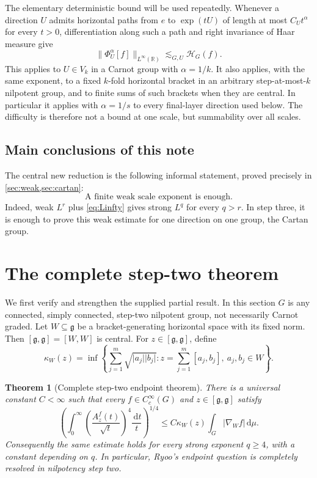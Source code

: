 \documentclass[11pt]{article}
\newtheorem{theorem}{Theorem}[section]
\theoremstyle{definition}
\theoremstyle{remark}
\newcommand{\R}{\mathbb R}
\newcommand{\g}{\mathfrak g}
\newcommand{\dd}{\,\mathrm d}
\newcommand{\abs}[1]{\lvert #1\rvert}
\newcommand{\norm}[1]{\lVert #1\rVert}
\newcommand{\A}[2]{A_{#1}^{#2}}
\newcommand{\HH}{\mathcal H}
\newcommand{\prof}[3]{\Phi^{#1}_{#2}[#3]}
\newcommand{\less}{\lesssim}
\begin{document}
The elementary deterministic bound will be used repeatedly.  Whenever a direction
\(U\) admits horizontal paths from \(e\) to \(\exp(tU)\) of length at most
\(C_Ut^\alpha\) for every \(t>0\), differentiation along such a path and right
invariance of Haar measure give
\begin{equation}\label{eq:Linfty}
 \norm{\prof{\alpha}{U}{f}}_{L^\infty(\R)}
 \less_{G,U}\HH_G(f).
\end{equation}
This applies to \(U\in V_k\) in a Carnot group with \(\alpha=1/k\).  It also applies,
with the same exponent, to a fixed \(k\)-fold horizontal bracket in an arbitrary
step-at-most-\(k\) nilpotent group, and to finite sums of such brackets when they are
central.  In particular it applies with \(\alpha=1/s\) to every final-layer direction
used below.  The difficulty is therefore not a bound at one scale, but summability over
all scales.

\subsection*{Main conclusions of this note}

The central new reduction is the following informal statement, proved precisely in
\cref{sec:weak,sec:cartan}:
\[
 \boxed{\text{A finite weak scale exponent is enough.}}
\]
Indeed, weak \(L^r\) plus \eqref{eq:Linfty} gives strong \(L^q\) for every \(q>r\).
In step three, it is enough to prove this weak estimate for one direction on one group,
the Cartan group.

\section{The complete step-two theorem}\label{sec:step2}

We first verify and strengthen the supplied partial result.  In this section \(G\) is any
connected, simply connected, step-two nilpotent group, not necessarily Carnot graded.
Let \(W\subseteq\g\) be a bracket-generating horizontal space with its fixed norm.  Then
\([\g,\g]=[W,W]\) is central.  For \(z\in[\g,\g]\), define
\begin{equation}\label{eq:kappa}
 \kappa_W(z)=\inf\left\{
 \sum_{j=1}^m\sqrt{\abs{a_j}\abs{b_j}}:
 z=\sum_{j=1}^m[a_j,b_j],\ a_j,b_j\in W
 \right\}.
\end{equation}

\begin{theorem}[Complete step-two endpoint theorem]\label{thm:step2}
There is a universal constant \(C<\infty\) such that every
\(f\in C_c^\infty(G)\) and \(z\in[\g,\g]\) satisfy
\begin{equation}\label{eq:step2q4}
 \left(\int_0^\infty
 \left(\frac{\A{z}{f}(t)}{\sqrt t}\right)^4\frac{\dd t}{t}
 \right)^{1/4}
 \le C\kappa_W(z)\int_G\abs{\nabla_Wf}\dd\mu.
\end{equation}
Consequently the same estimate holds for every strong exponent \(q\ge4\), with a
constant depending on \(q\).  In particular, Ryoo's endpoint question is completely
resolved in nilpotency step two.
\end{theorem}
\end{document}
